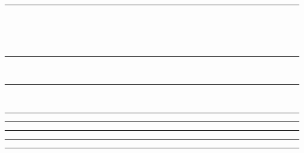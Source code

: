 \documentclass{article}
\begin{document}
\hrule
\begin{code}%
\>\<%
\\
\> \<%
\\
\>[0]\AgdaIndent{}\<[2]%
\>[2] \AgdaSymbol{:}  \<%
\\
\>[0]\AgdaIndent{}\<[2]%
\>[2] \AgdaSymbol{:}  \<[11]%
\>[11]\<%
\end{code}
\hrule
\begin{code}%
\>\<%
\\
\>[0]\AgdaIndent{}\<[2]%
\>[2]\<%
\end{code}
\hrule
\begin{code}%
\>\<%
\\
\>\<%
\end{code}
\hrule
\begin{code}%
\>\<%
\end{code}
\hrule
\begin{code}%
\>[0]\AgdaIndent{}\<[2]%
\>[2]\<%
\end{code}
\hrule
  \begin{code}%
\>[0]\AgdaIndent{}\<[2]%
\>[2]\<%
\end{code}
\hrule
  \begin{code}%
\>[0]\AgdaIndent{}\<[2]%
\>[2]\<%
\end{code}
\hrule
\end{document}

